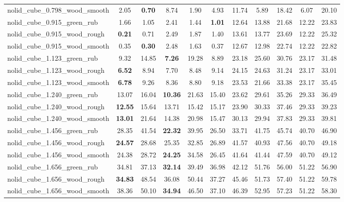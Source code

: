 \begin{table}[H]
{\begin{tabular}{l cccccccccc}
        nolid\_cube\_0.798\_wood\_smooth & 2.05 & \textbf{0.70} & 8.74 & 1.90 & 4.93 & 11.74 & 5.89 & 18.42 & 6.07 & 20.10 \\
        nolid\_cube\_0.915\_green\_rub & 1.66 & 1.05 & 2.41 & 1.44 & \textbf{1.01} & 12.64 & 13.88 & 21.68 & 12.22 & 23.83 \\
        nolid\_cube\_0.915\_wood\_rough & \textbf{0.21} & 0.71 & 2.49 & 1.87 & 1.40 & 13.61 & 13.77 & 23.69 & 12.22 & 25.32 \\
        nolid\_cube\_0.915\_wood\_smooth & 0.35 & \textbf{0.30} & 2.48 & 1.63 & 0.37 & 12.67 & 12.98 & 22.74 & 12.22 & 22.82 \\
        nolid\_cube\_1.123\_green\_rub & 9.32 & 14.85 & \textbf{7.26} & 19.28 & 8.89 & 23.18 & 25.60 & 30.76 & 23.17 & 31.48 \\
        nolid\_cube\_1.123\_wood\_rough & \textbf{6.52} & 8.94 & 7.70 & 8.48 & 9.14 & 24.15 & 24.63 & 31.24 & 23.17 & 33.01 \\
        nolid\_cube\_1.123\_wood\_smooth & \textbf{6.78} & 9.26 & 8.36 & 8.80 & 9.18 & 23.53 & 21.66 & 33.38 & 23.17 & 35.45 \\
        nolid\_cube\_1.240\_green\_rub & 13.07 & 16.04 & \textbf{10.36} & 21.63 & 15.40 & 23.62 & 29.61 & 35.26 & 29.33 & 36.49 \\
        nolid\_cube\_1.240\_wood\_rough & \textbf{12.55} & 15.64 & 13.71 & 15.42 & 15.17 & 23.90 & 30.33 & 37.46 & 29.33 & 39.23 \\
        nolid\_cube\_1.240\_wood\_smooth & \textbf{13.01} & 21.64 & 14.38 & 20.98 & 15.47 & 30.13 & 29.94 & 37.83 & 29.33 & 39.81 \\
        nolid\_cube\_1.456\_green\_rub & 28.35 & 41.54 & \textbf{22.32} & 39.95 & 26.50 & 33.71 & 41.75 & 45.74 & 40.70 & 46.90 \\
        nolid\_cube\_1.456\_wood\_rough & \textbf{24.57} & 28.68 & 25.35 & 32.85 & 26.89 & 41.57 & 40.93 & 47.56 & 40.70 & 49.18 \\
        nolid\_cube\_1.456\_wood\_smooth & 24.38 & 28.72 & \textbf{24.25} & 34.58 & 26.45 & 41.64 & 41.44 & 47.59 & 40.70 & 49.12 \\
        nolid\_cube\_1.656\_green\_rub & 34.81 & 37.13 & \textbf{32.14} & 39.49 & 36.98 & 42.12 & 51.76 & 56.00 & 51.22 & 56.90 \\
        nolid\_cube\_1.656\_wood\_rough & \textbf{34.83} & 48.54 & 36.08 & 50.44 & 37.27 & 45.46 & 51.73 & 57.40 & 51.22 & 59.78 \\
        nolid\_cube\_1.656\_wood\_smooth & 38.36 & 50.10 & \textbf{34.94} & 46.50 & 37.10 & 46.39 & 52.95 & 57.23 & 51.22 & 58.30 \\

\end{tabular}}
\end{table}
